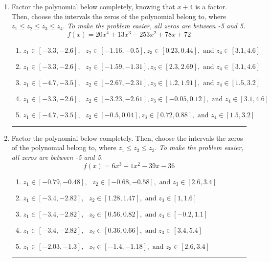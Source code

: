 \documentclass[14pt]{extbook}
\newcommand{\litem}[1]{\item#1\hspace*{-1cm}\rule{\textwidth}{0.4pt}}
\begin{document}
\begin{enumerate}
{\begin{enumerate}[label=\Alph*.]
\end{enumerate} }
\litem{
Factor the polynomial below completely, knowing that $x + 4$ is a factor. Then, choose the intervals the zeros of the polynomial belong to, where $z_1 \leq z_2 \leq z_3 \leq z_4$. \textit{To make the problem easier, all zeros are between -5 and 5.}\[ f(x) = 20x^{4} +13 x^{3} -253 x^{2} +78 x + 72 \]\begin{enumerate}[label=\Alph*.]
\item \( z_1 \in [-3.3, -2.6], \text{   }  z_2 \in [-1.16, -0.5], z_3 \in [0.23, 0.44], \text{   and   } z_4 \in [3.1, 4.6] \)
\item \( z_1 \in [-3.3, -2.6], \text{   }  z_2 \in [-1.59, -1.31], z_3 \in [2.3, 2.69], \text{   and   } z_4 \in [3.1, 4.6] \)
\item \( z_1 \in [-4.7, -3.5], \text{   }  z_2 \in [-2.67, -2.31], z_3 \in [1.2, 1.91], \text{   and   } z_4 \in [1.5, 3.2] \)
\item \( z_1 \in [-3.3, -2.6], \text{   }  z_2 \in [-3.23, -2.61], z_3 \in [-0.05, 0.12], \text{   and   } z_4 \in [3.1, 4.6] \)
\item \( z_1 \in [-4.7, -3.5], \text{   }  z_2 \in [-0.5, 0.04], z_3 \in [0.72, 0.88], \text{   and   } z_4 \in [1.5, 3.2] \)

\end{enumerate} }
\litem{
Factor the polynomial below completely. Then, choose the intervals the zeros of the polynomial belong to, where $z_1 \leq z_2 \leq z_3$. \textit{To make the problem easier, all zeros are between -5 and 5.}\[ f(x) = 6x^{3} -1 x^{2} -39 x -36 \]\begin{enumerate}[label=\Alph*.]
\item \( z_1 \in [-0.79, -0.48], \text{   }  z_2 \in [-0.68, -0.58], \text{   and   } z_3 \in [2.6, 3.4] \)
\item \( z_1 \in [-3.4, -2.82], \text{   }  z_2 \in [1.28, 1.47], \text{   and   } z_3 \in [1, 1.6] \)
\item \( z_1 \in [-3.4, -2.82], \text{   }  z_2 \in [0.56, 0.82], \text{   and   } z_3 \in [-0.2, 1.1] \)
\item \( z_1 \in [-3.4, -2.82], \text{   }  z_2 \in [0.36, 0.66], \text{   and   } z_3 \in [3.4, 5.4] \)
\item \( z_1 \in [-2.03, -1.3], \text{   }  z_2 \in [-1.4, -1.18], \text{   and   } z_3 \in [2.6, 3.4] \)


\end{enumerate}}
\end{enumerate}
\end{document}
